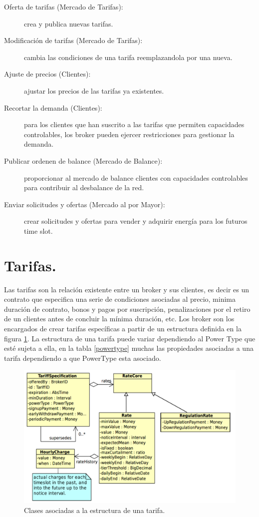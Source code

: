 \begin{description}
    \item [Oferta de tarifas (Mercado de Tarifas):] crea y publica nuevas tarifas.
    \item [Modificación de tarifas (Mercado de Tarifas):]  cambia las condiciones de una tarifa reemplazandola por una nueva.
    \item [Ajuste de precios (Clientes):] ajustar los precios de las tarifas ya existentes.
    \item [Recortar la demanda (Clientes):] para los clientes que han suscrito a las tarifas que permiten capacidades controlables, los broker pueden ejercer restricciones para gestionar la demanda.
    \item [Publicar ordenen de balance (Mercado de Balance):] proporcionar al mercado de balance clientes con capacidades controlables para contribuir al desbalance de la red.
    \item [Enviar solicitudes y ofertas (Mercado al por Mayor):]  crear solicitudes y ofertas para vender y adquirir energía para los futuros time slot.
\end{description}

\section{Tarifas.}
Las tarifas son la relación existente entre un broker y sus clientes, es decir es un contrato que especifica una serie de condiciones asociadas al precio, minima duración de contrato, bonos y pagos por suscripción, penalizaciones por el retiro de un clientes antes de concluir la mínima duración, etc. Los broker son los encargados de crear tarifas específicas a partir de un estructura definida  en la figura \ref{tariff}. La estructura de una tarifa puede variar dependiendo al Power Type que esté sujeta a ella, en la tabla \ref{powertype} muchas las propiedades asociadas a una tarifa dependiendo a que PowerType esta asociado.

\begin{figure}[h!]
    \centering
    \includegraphics[width=13cm]{img/tariffstructe.png}
    \caption{Clases asociadas a la estructura de una tarifa.}
    \label{tariff}
\end{figure}

